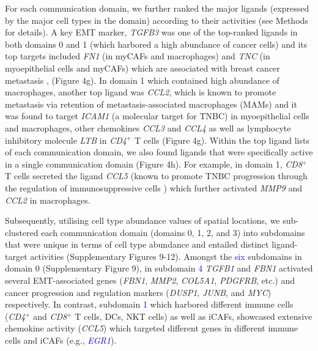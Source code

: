 For each communication domain, we further ranked the major ligands (expressed by the major cell types in the domain) according to their activities (see Methods for details). A key EMT marker, \textit{TGFB3} \citep{jcm5070063} was one of the top-ranked ligands in both domains 0 and 1 (which harbored a high abundance of cancer cells) and its top targets included \textit{FN1} (in myCAFs and macrophages) and \textit{TNC} (in myoepithelial cells and myCAFs) which are associated with breast cancer metastasis \citep{Wang2018}, \citep{Oskarsson2011} (Figure 4g). In domain 1 which contained high abundance of macrophages, another top ligand was \textit{CCL2}, which is known to promote metastasis via retention of metastasis-associated macrophages (MAMs) \citep{10.1084/jem.20141836} and it was found to target \textit{ICAM1} (a molecular target for TNBC) \citep{doi:10.1073/pnas.1408556111} in myoepithelial cells and macrophages, other chemokines \textit{CCL3} and \textit{CCL4} as well as lymphocyte inhibitory molecule \textit{LTB} in \textit{CD4}$^{+}$ T cells (Figure 4g). Within the top ligand lists of each communication domain, we also found ligands that were specifically active in a single communication domain (Figure 4h). For example, in domain 1, \textit{CD8}$^{+}$ T cells secreted the ligand \textit{CCL5} (known to promote TNBC progression through the regulation of immunosuppressive cells \citep{Zhang2013}) which further activated \textit{MMP9} and \textit{CCL2} in macrophages. \par

Subsequently, utilising cell type abundance values of spatial locations, we sub-clustered each communication domain (domains 0, 1, 2, and 3) into subdomains that were unique in terms of cell type abundance and entailed distinct ligand-target activities (Supplementary Figures 9-12). Amongst the \textcolor{blue}{six} subdomains in domain 0 (Supplementary Figure 9), in subdomain \textcolor{blue}{4} \textit{TGFB1} and \textit{FBN1} activated several EMT-associated genes (\textit{FBN1}, \textit{MMP2}, \textit{COL5A1}, \textit{PDGFRB}, etc.) \citep{10.1172/JCI45014} and cancer progression and regulation markers (\textit{DUSP1}, \textit{JUNB}, and \textit{MYC}) \citep{Tuglu2018, Lukey2016} respectively. In contrast, subdomain \textcolor{blue}{1} which harbored different immune cells (\textit{CD4}$^{+}$ and \textit{CD8}$^{+}$ T cells, DCs, NKT cells) as well as iCAFs, showcased extensive chemokine activity (\textit{CCL5}) which targeted different genes in different immune cells and iCAFs (e.g., \textcolor{blue}{\textit{EGR1}}). 


